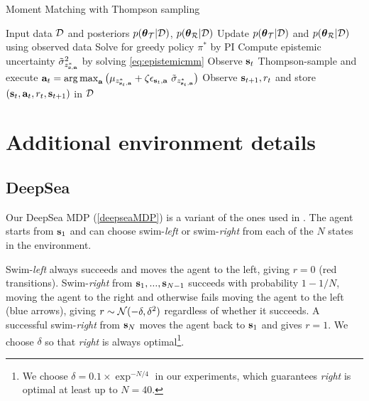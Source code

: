 \documentclass{article}
\begin{document}
\begin{appendices}
\begin{algorithm}
  \caption{Moment Matching with Thompson sampling}\label{alg:tmm}
  \begin{algorithmic}[1]
\State Input data $\mathcal{D}$ and posteriors $p(\boldsymbol{\theta}_{\mathcal{T}} | \mathcal{D})$, $p(\boldsymbol{\theta}_{\mathcal{R}} | \mathcal{D})$
	\State Update $p(\boldsymbol{\theta}_{\mathcal{T}} | \mathcal{D})$ and $p(\boldsymbol{\theta}_{\mathcal{R}} | \mathcal{D})$ using observed data
	\State Solve for greedy policy ${\pi^*}$ by PI
	\State Compute epistemic uncertainty $\tilde{\sigma}_{z^*_{\mathbf{s}, \mathbf{a}}}^2$ by solving \cref{eq:epistemicmm}
	\EndIf
 	\State Observe $\mathbf{s}_t$
	\State Thompson-sample and execute $\mathbf{a}_t = \operatorname*{arg\,max}_{\mathbf{a}} \big(\mu_{z_{\mathbf{s}_t, \mathbf{a}}^*} + \zeta \epsilon_{\mathbf{s}_t, \mathbf{a}}~\tilde{\sigma}_{z^*_{\mathbf{s}_t, \mathbf{a}}}\big)$
	\State Observe $\mathbf{s}_{t+1}, r_{t}$ and store $(\mathbf{s}_{t}, \mathbf{a}_t, r_{t}, \mathbf{s}_{t+1})$ in $\mathcal{D}$
 \EndFor
\end{algorithmic}
\end{algorithm}

\clearpage

\section{Additional environment details} \label{app:env}

\subsection{DeepSea}

Our DeepSea MDP (\cref{deepseaMDP}) is a variant of the ones used in \cite{rand_val_func, deepsea}. The agent starts from $\mathbf{s}_1$ and can choose swim-\textit{left} or swim-\textit{right} from each of the $N$ states in the environment.

Swim-\textit{left} always succeeds and moves the agent to the left, giving $r = 0$ (red transitions). Swim-\textit{right} from $\mathbf{s}_1, ..., \mathbf{s}_{N-1}$ succeeds with probability $1 - 1/N$, moving the agent to the right and otherwise fails moving the agent to the left (blue arrows), giving $r \sim \mathcal{N}(-\delta, \delta^2)$ regardless of whether it succeeds. A successful swim-\textit{right} from $\mathbf{s}_N$ moves the agent back to $\mathbf{s}_1$ and gives $r = 1$. We choose $\delta$ so that \textit{right} is always optimal\footnote{We choose $\delta = 0.1 \times \exp^{-N / 4}$ in our experiments, which guarantees \textit{right} is optimal at least up to $N = 40$.}.

\begin{figure}[h!]
\centering
{}
\end{figure}
\end{appendices}
\end{document}
